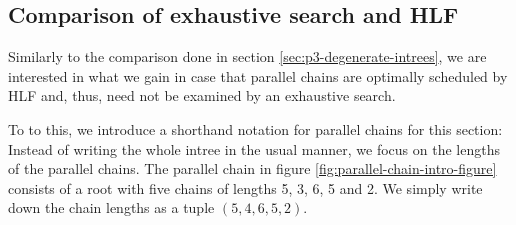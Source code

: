   




\subsection{Comparison of exhaustive search and HLF}
\label{sec:parallel-chains-benchmarking}

Similarly to the comparison done in section \ref{sec:p3-degenerate-intrees}, we are interested in what we gain in case that parallel chains are optimally scheduled by HLF and, thus, need not be examined by an exhaustive search. 

To to this, we introduce a shorthand notation for parallel chains for this section: Instead of writing the whole intree in the usual manner, we focus on the lengths of the parallel chains. The parallel chain in figure \ref{fig:parallel-chain-intro-figure} consists of a root with five chains of lengths 5, 3, 6, 5 and 2. We simply write down the chain lengths as a tuple $(5,4,6,5,2)$.

